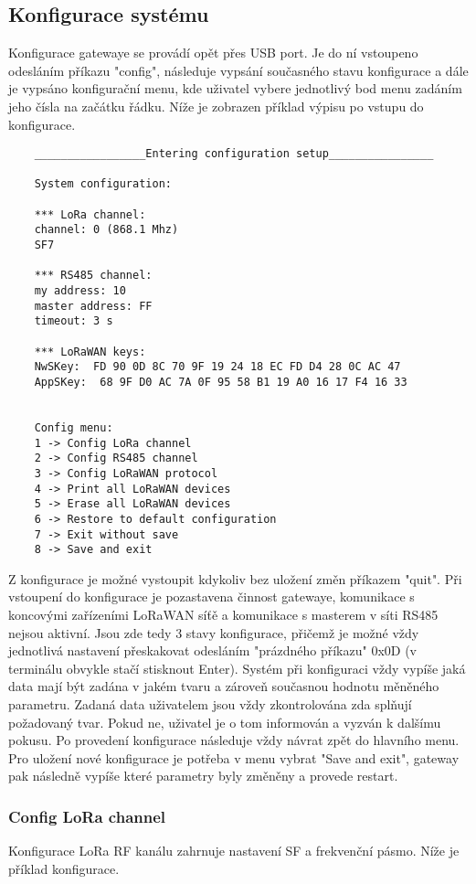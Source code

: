 \subsection{Konfigurace systému}
\label{sec:konfigurace}
Konfigurace gatewaye se provádí opět přes USB port. Je do ní vstoupeno odesláním příkazu
"config", následuje vypsání současného stavu konfigurace a dále je vypsáno konfigurační menu, kde uživatel vybere jednotlivý bod menu zadáním jeho čísla na začátku řádku.
Níže je zobrazen příklad výpisu po vstupu do konfigurace.

\begin{lstlisting}
    _________________Entering configuration setup________________
    
    System configuration:
    
    *** LoRa channel: 
    channel: 0 (868.1 Mhz)
    SF7
    
    *** RS485 channel: 
    my address: 10
    master address: FF
    timeout: 3 s
    
    *** LoRaWAN keys: 
    NwSKey:  FD 90 0D 8C 70 9F 19 24 18 EC FD D4 28 0C AC 47
    AppSKey:  68 9F D0 AC 7A 0F 95 58 B1 19 A0 16 17 F4 16 33
    
    
    Config menu:
    1 -> Config LoRa channel
    2 -> Config RS485 channel
    3 -> Config LoRaWAN protocol
    4 -> Print all LoRaWAN devices
    5 -> Erase all LoRaWAN devices
    6 -> Restore to default configuration
    7 -> Exit without save
    8 -> Save and exit
\end{lstlisting}
    

Z konfigurace je možné vystoupit kdykoliv bez uložení změn příkazem "quit". 
Při vstoupení do konfigurace je pozastavena činnost gatewaye, komunikace s koncovými zařízeními LoRaWAN síťě a komunikace s masterem v síti RS485 nejsou aktivní.
Jsou zde tedy 3 stavy konfigurace, přičemž je možné vždy jednotlivá nastavení přeskakovat odesláním "prázdného příkazu" 0x0D (v terminálu obvykle stačí stisknout Enter). Systém při konfiguraci vždy vypíše jaká data mají být zadána v jakém tvaru a zároveň současnou hodnotu měněného parametru. Zadaná data uživatelem jsou vždy zkontrolována zda splňují požadovaný tvar. Pokud ne, uživatel je o tom informován a vyzván k dalšímu pokusu.
Po provedení konfigurace následuje vždy návrat zpět do hlavního menu. Pro uložení nové konfigurace je potřeba v menu vybrat "Save and exit", gateway pak následně vypíše které parametry byly změněny a provede restart.

\subsubsection{Config LoRa channel}
Konfigurace LoRa RF kanálu zahrnuje nastavení SF a frekvenční pásmo. Níže je příklad konfigurace.

